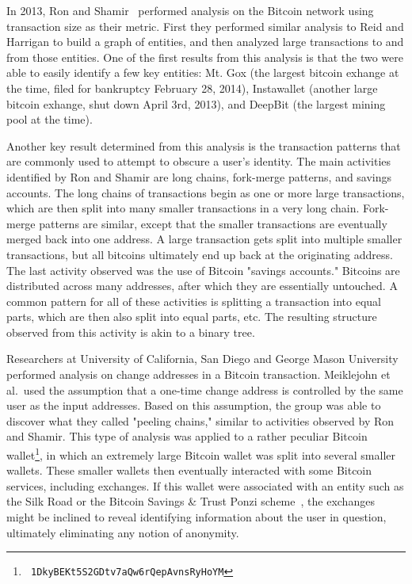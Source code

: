 \documentclass[11pt]{article}
\begin{document}
In 2013, Ron and Shamir~\cite{ron13} performed analysis on the Bitcoin network
using transaction size as their metric. First they performed similar analysis to
Reid and Harrigan to build a graph of entities, and then analyzed large
transactions to and from those entities. One of the first results from this
analysis is that the two were able to easily identify a few key entities: Mt.
Gox (the largest bitcoin exhange at the time, filed for bankruptcy February 28,
2014), Instawallet (another large bitcoin exhange, shut down April 3rd, 2013),
and DeepBit (the largest mining pool at the time).

Another key result determined
from this analysis is the transaction patterns that are commonly used to attempt
to obscure a user's identity. The main activities identified by Ron and Shamir
are long chains, fork-merge patterns, and savings accounts. The long chains of
transactions begin as one or more large transactions, which are then split into
many smaller transactions in a very long chain. Fork-merge patterns are similar,
except that the smaller transactions are eventually merged back into one
address. A large transaction gets split into multiple smaller transactions, but
all bitcoins ultimately end up back at the originating address. The last
activity observed was the use of Bitcoin "savings accounts." Bitcoins are
distributed across many addresses, after which they are essentially untouched. A
common pattern for all of these activities is splitting a transaction into equal
parts, which are then also split into equal parts, etc. The resulting structure
observed from this activity is akin to a binary tree.

Researchers at University of California, San Diego and George Mason
University~\cite{meiklejohn13} performed analysis on change addresses in a
Bitcoin transaction. Meiklejohn et al.\ used the assumption that a one-time
change address is controlled by the same user as the input addresses. Based on
this assumption, the group was able to discover what they called "peeling
chains," similar to activities observed by Ron and Shamir. This type of analysis
was applied to a rather peculiar Bitcoin wallet\footnote{\tt
1DkyBEKt5S2GDtv7aQw6rQepAvnsRyHoYM}, in which an extremely large Bitcoin wallet
was split into several smaller wallets. These smaller wallets then eventually
interacted with some Bitcoin services, including exchanges. If this wallet were
associated with an entity such as the Silk Road or the Bitcoin Savings \& Trust
Ponzi scheme~\cite{moore13}, the exchanges might be inclined to reveal
identifying information about the user in question, ultimately eliminating any
notion of anonymity.
\end{document}

